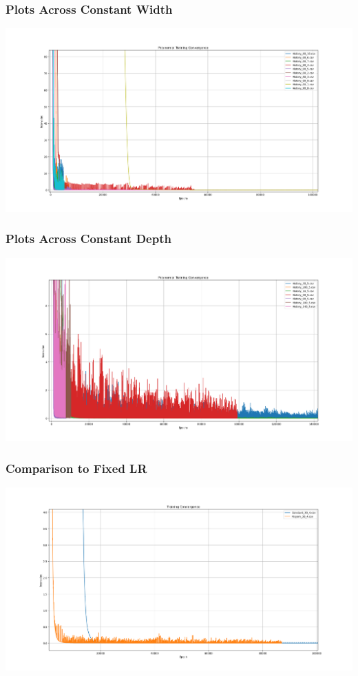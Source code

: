 \documentclass[a4paper, 12pt]{report}
\def\size{0.39}
\begin{document}
\begin{center}
\subsubsection{Plots Across Constant Width}

\includegraphics[scale=\size]{Poly_Cons_W.png}
\subsubsection{Plots Across Constant Depth}

\includegraphics[scale=\size]{Poly_Cons_D.png}
\subsubsection{Comparison to Fixed LR}

\includegraphics[scale=\size]{Comparison_Poly.png}

\end{center}
\end{document}
